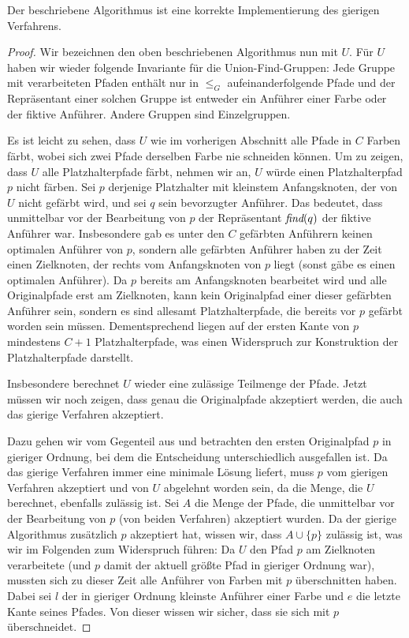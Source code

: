 \begin{lemma}
    Der beschriebene Algorithmus ist eine korrekte Implementierung des gierigen Verfahrens.
\end{lemma}
\begin{proof}
    Wir bezeichnen den oben beschriebenen Algorithmus nun mit $U$.
    Für $U$ haben wir wieder folgende Invariante für die Union-Find-Gruppen:
    Jede Gruppe mit verarbeiteten Pfaden enthält nur in $\leq_G$ aufeinanderfolgende Pfade und der Repräsentant einer
    solchen Gruppe ist entweder ein Anführer einer Farbe oder der fiktive Anführer.
    Andere Gruppen sind Einzelgruppen.

    Es ist leicht zu sehen, dass $U$ wie im vorherigen Abschnitt alle Pfade in $C$ Farben färbt, wobei sich zwei Pfade
    derselben Farbe nie schneiden können.
    Um zu zeigen, dass $U$ alle Platzhalterpfade färbt, nehmen wir an, $U$ würde einen Platzhalterpfad $p$ nicht färben.
    Sei $p$ derjenige Platzhalter mit kleinstem Anfangsknoten, der von $U$ nicht gefärbt wird, und sei $q$ sein bevorzugter Anführer.
    Das bedeutet, dass unmittelbar vor der Bearbeitung von $p$ der Repräsentant $\text{\em find}(q)$ der fiktive Anführer war.
    Insbesondere gab es unter den $C$ gefärbten Anführern keinen optimalen Anführer von $p$, sondern alle gefärbten Anführer
    haben zu der Zeit einen Zielknoten, der rechts vom Anfangsknoten von $p$ liegt (sonst gäbe es einen optimalen Anführer).
    Da $p$ bereits am Anfangsknoten bearbeitet wird und alle Originalpfade erst am Zielknoten, kann kein Originalpfad einer
    dieser gefärbten Anführer sein, sondern es sind allesamt Platzhalterpfade, die bereits vor $p$ gefärbt worden sein müssen.
    Dementsprechend liegen auf der ersten Kante von $p$ mindestens $C+1$ Platzhalterpfade, was einen Widerspruch zur Konstruktion
    der Platzhalterpfade darstellt.

    Insbesondere berechnet $U$ wieder eine zulässige Teilmenge der Pfade.
    Jetzt müssen wir noch zeigen, dass genau die Originalpfade akzeptiert werden, die auch das gierige Verfahren
    akzeptiert.

    Dazu gehen wir vom Gegenteil aus und betrachten den ersten Originalpfad $p$ in gieriger Ordnung, bei dem die
    Entscheidung unterschiedlich ausgefallen ist.
    Da das gierige Verfahren immer eine minimale Lösung liefert, muss $p$ vom gierigen Verfahren akzeptiert und von
    $U$ abgelehnt worden sein, da die Menge, die $U$ berechnet, ebenfalls zulässig ist.
    Sei $A$ die Menge der Pfade, die unmittelbar vor der Bearbeitung von $p$ (von beiden Verfahren) akzeptiert wurden.
    Da der gierige Algorithmus zusätzlich $p$ akzeptiert hat, wissen wir, dass $A \cup \{p\}$ zulässig ist, was wir
    im Folgenden zum Widerspruch führen:
    Da $U$ den Pfad $p$ am Zielknoten verarbeitete (und $p$ damit der aktuell größte Pfad in gieriger Ordnung
    war), mussten sich zu dieser Zeit alle Anführer von Farben mit $p$ überschnitten haben.
    Dabei sei $l$ der in gieriger Ordnung kleinste Anführer einer Farbe und $e$ die letzte Kante seines Pfades.
    Von dieser wissen wir sicher, dass sie sich mit $p$ überschneidet.


\end{proof}
